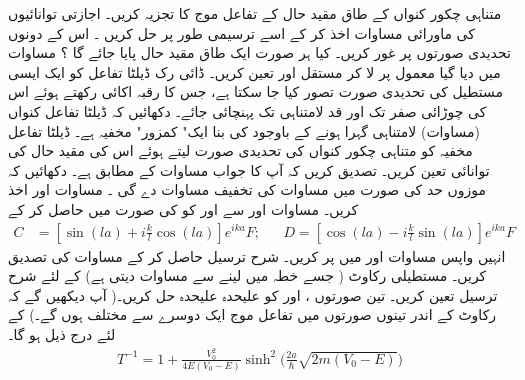  
متناہی چکور  کنواں کے طاق مقید حال کے  تفاعل  موج کا تجزیہ کریں۔ اجازتی  توانائیوں کی ماورائی مساوات اخذ کر کے اسے ترسیمی طور پر حل کریں ۔ اس کے  دونوں تحدیدی صورتوں پر غور کریں۔  کیا ہر صورت ایک طاق مقید حال پایا جائے گا ؟ 
 مساوات  میں دیا گیا   معمول پر  لا کر مستقل  اور  تعین  کریں۔
ڈائی رک ڈیلٹا تفاعل کو ایک ایسی مستطیل کی  تحدیدی صورت تصور کیا  جا سکتا ہے،  جس کا  رقبہ اکائی   رکھتے ہوئے اس کی چوڑائی صفر  تک  اور قد لامتناہی تک پہنچائی جائے۔ دکھائیں کہ  ڈیلٹا تفاعل کنواں (مساوات)   لامتناہی گہرا  ہونے کے باوجود  کی بنا ایک" کمزور" مخفیہ ہے۔   ڈیلٹا تفاعل مخفیہ  کو  متناہی چکور  کنواں کی تحدیدی  صورت لیتے ہوئے اس کی مقید حال کی توانائی تعین کریں۔ تصدیق کریں کہ آپ کا جواب مساوات  کے مطابق ہے۔   دکھائیں کہ موزوں حد کی صورت میں مساوات  کی تخفیف مساوات  دے گی ۔
مساوات  اور  اخذ کریں۔  مساوات  اور سے   اور   کو   کی صورت میں حاصل  کر کے
\begin{align*}
C&=[\sin(la)+i\frac{k}{l}\cos(la)]e^{ika}F; && D=[\cos(la)-i\frac{k}{l}\sin(la)]e^{ika}F
 \end{align*}
 انہیں واپس مساوات   اور  میں پر کریں۔  شرح ترسیل حاصل کر کے مساوات کی تصدیق کریں۔
مستطیلی رکاوٹ ( جسے  خطہ  میں لینے سے مساوات   دیتی ہے)   کے لئے  شرح ترسیل  تعین کریں۔  تین صورتوں   ،
اور  کو علیحدہ علیحدہ حل کریں۔(  آپ دیکھیں گے کہ رکاوٹ کے اندر تینوں صورتوں میں تفاعل موج ایک دوسرے سے مختلف ہوں  گے۔)     کے لئے درج ذیل ہو گا۔
\begin{align*}
T^{-1}=1+\frac{V_{0}^2}{4E(V_{0}-E)}\sinh^{2}\Big(\frac{2a}{\hslash}\sqrt{2m(V_{0}-E)}   \Big) 
\end{align*}
